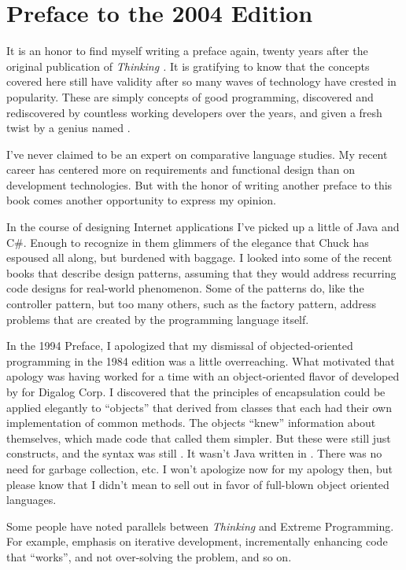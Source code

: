 \chapter*{Preface to the 2004 Edition}\label{preface2004}
\pagestyle{headings}

\initial It is an honor to find myself writing a preface again, twenty years
after the original publication of \emph{Thinking \Forth{}.} It is gratifying to
know that the concepts covered here still have validity after so many
waves of technology have crested in popularity. These are simply
concepts of good programming, discovered and rediscovered by countless
working developers over the years, and given a fresh twist by a genius
named .

I've never claimed to be an expert on comparative language studies. My
recent career has centered more on requirements and functional design
than on development technologies. But with the honor of writing
another preface to this book comes another opportunity to express my
opinion.

In the course of designing Internet applications I've picked up a
little of Java and C\#. Enough to recognize in them glimmers of the
elegance that Chuck has espoused all along, but burdened with
baggage. I looked into some of the recent books that describe design
patterns, assuming that they would address recurring code designs for
real-world phenomenon. Some of the patterns do, like the controller
pattern, but too many others, such as the factory pattern, address
problems that are created by the programming language itself.

In the 1994 Preface, I apologized that my dismissal of
objected-oriented programming in the 1984 edition was a little
overreaching. What motivated that apology was having worked for a time
with an object-oriented flavor of \Forth{} developed by  for Digalog Corp. I discovered that the principles of
encapsulation could be applied elegantly to \Forth{} ``objects'' that
derived from classes that each had their own implementation of common
methods. The objects ``knew'' information about themselves, which made
code that called them simpler. But these were still just \Forth{}
constructs, and the syntax was still \Forth{}. It wasn't Java written
in \Forth{}. There was no need for garbage collection, etc. I won't
apologize now for my apology then, but please know that I didn't mean
to sell out in favor of full-blown object oriented languages.

Some people have noted parallels between \emph{Thinking \Forth{}} and
Extreme Programming. For example, emphasis on iterative development,
incrementally enhancing code that ``works'', and not over-solving the
problem, and so on.

